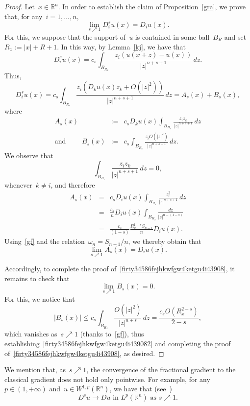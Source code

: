 \documentclass[11pt,hyp,]{nyjm}
\numberwithin{equation}{section}
\newcommand{\R}{\mathbb{R}}
\theoremstyle{remark}
\renewcommand{\le}{\leqslant}
\begin{document}
			\begin{proof} Let~$x \in \R^n$.
			In order to establish the claim of Proposition~\ref{gra}, we prove that, for any~$i= 1, \ldots, n$, 
			\begin{equation}\label{firty34586fejhkwfgw4ketgu4i43908}
			\lim_{s \nearrow 1}  D^s_i u (x) =  D_i u (x).\end{equation}
For this, we suppose that the support of~$u$ is contained in some ball~$B_R$ and set~$R_x:=|x|+R+1$. In this way, by Lemma~\ref{kj}, we have that
				\[D^s_i u (x) = c_s \int_{B_{R_x}}\frac{z_i (u(x+z)-u(x))}{|z|^{n+s+1}}  \, dz.\]
Thus,
\begin{equation}\label{popo}	D^s_i u (x) = c_s \int_{B_{R_x}} \frac{z_i (D_ku(x) z_k+ O(|z|^2)) }{|z|^{n+s+1}} \, dz  = A_s(x) + B_s(x),
				\end{equation}
where
\begin{eqnarray*} A_s(x) &:=& c_s D_ku(x) \int_{B_{R_x}}  \frac{ z_i z_k }{|z|^{n+s+1}} \, dz \\
{\mbox{and }}\qquad
B_s(x) &:=& c_s \int_{B_{R_x}} \frac{z_i  O(|z|^2)}{|z|^{n+s+1}} \, dz. \end{eqnarray*}
We observe that
				\[\int_{B_{R_x}}  \frac{ z_i z_k }{|z|^{n+s+1}} \, dz= 0,\]
				whenever~$k \neq i$, and therefore
\begin{eqnarray*}
					A_s(x) &=& c_s D_iu(x) \int_{B_{R_x}}  \frac{ z^{2}_i }{|z|^{n+s+1}} \, dz \\&=& \frac{c_s}{n} D_iu(x)   \int_{B_{R_x}}  \frac{ dz  }{|z|^{n-(1-s)}} 
					\\&=& \frac{c_s}{(1-s)}   \frac{R_x^{1-s}S_{n-1}}{n}D_iu(x).\end{eqnarray*}
				Using~\eqref{gf} and the relation~$\omega_n= S_{n-1}/n$, we thereby obtain that
$$				\lim_{s \nearrow 1} A_s(x) = D_iu(x).$$

Accordingly, to complete the proof of~\eqref{firty34586fejhkwfgw4ketgu4i43908},
it remains to check that
\begin{equation}\label{firty34586fejhkwfgw4ketgu4i439082}
\lim_{s\nearrow 1} B_s(x) =0.
\end{equation}
For this, we notice that
$$ |B_s(x)|\le c_s \int_{B_{R_x}} \frac{O(|z|^2)}{|z|^{n+s}} \, dz 
= \frac{c_s O(R_x^{2-s})}{2-s},	$$
which vanishes as~$s\nearrow1$ (thanks to~\eqref{gf}), thus establishing~\eqref{firty34586fejhkwfgw4ketgu4i439082}
and completing the proof of~\eqref{firty34586fejhkwfgw4ketgu4i43908}, as desired.
\end{proof}

We mention that, as~$s \nearrow 1$, the convergence of the fractional gradient to the classical gradient does not hold only pointwise. For example, for any~$p \in (1, +\infty)$ and~$u \in W^{1,p}(\R^n)$, we have that (see~\cite[Theorem~3.2]{mora})
			\[ {\mbox{$D^s u \to  Du$ in~$L^p(\R^n)$ as~$s \nearrow 1$.}}\]
	
\end{document}
